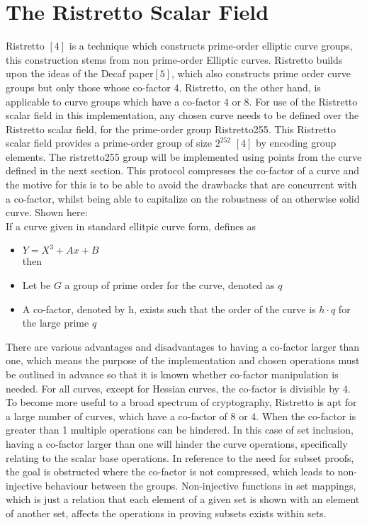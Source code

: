 \documentclass{article}
\begin{document}
\section{The Ristretto Scalar Field}
Ristretto $[4]$ is a technique which constructs prime-order elliptic curve groups, this construction stems from non prime-order Elliptic curves. Ristretto builds upon the ideas of the Decaf paper$[5]$, which also constructs prime order curve groups but only those whose co-factor 4. Ristretto, on the other hand, is applicable to curve groups which have a co-factor 4 or 8. For use of the Ristretto scalar field in this implementation, any chosen curve needs to be defined over the Ristretto scalar field, for the prime-order group Ristretto255. This Ristretto scalar field provides a prime-order group of size $2^{252}$ $[4]$ by encoding group elements. The ristretto255 group will be implemented using points from the curve defined in the next section.  This protocol compresses the co-factor of a curve and the motive for this is to be able to avoid the drawbacks that are concurrent with a co-factor, whilst being able to capitalize on the robustness of an otherwise solid curve. Shown here:\\ If a curve given in standard ellitpic curve form, defines as \\
\begin{itemize} 
    \item $Y = X^3 + Ax + B$\\ 
    then
    \item Let be $G$ a group of prime order for the curve, denoted as $q$
    \item  A co-factor, denoted by h, exists such that the order of the curve is $h \cdot q$ for the large prime $q$ 
\end{itemize} 
\hfill \break
There are various advantages and disadvantages to having a co-factor larger than one, which means the purpose of the implementation and chosen operations must be outlined in advance so that it is known whether co-factor manipulation is needed. For all curves, except for Hessian curves, the co-factor is divisible by 4. To become more useful to a broad spectrum of cryptography, Ristretto is apt for a large number of curves, which have a co-factor of 8 or 4. When the co-factor is greater than 1 multiple operations can be hindered. In this case of set inclusion, having a co-factor larger than one will hinder the curve operations, specifically relating to the scalar base operations. In reference to the need for subset proofs, the goal is obstructed where the co-factor is not compressed, which leads to non-injective behaviour between the groups. Non-injective functions in set mappings, which is just a relation that each element of a given set is shown with an element of another set, affects the operations in proving subsets exists within sets. \\
\end{document}
